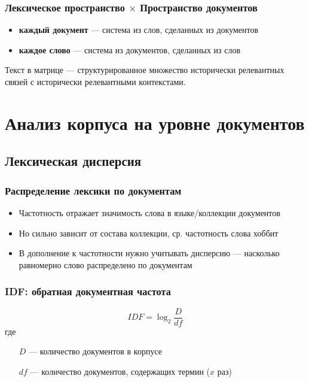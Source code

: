 \documentclass[svgnames]{beamer}
\begin{document}
\begin{frame}
  \frametitle{Лексическое пространство $\times$ Пространство документов}
  \begin{itemize}
  \item \textbf{каждый документ} — система из слов, сделанных из
    документов
  \item \textbf{каждое слово} — система из документов, сделанных из
    слов
  \end{itemize}
  \pause
  \begin{block}{Текст в матрице —}
    структурированное множество исторически релевантных связей с
    исторически релевантными контекстами.
  \end{block}
\end{frame}

\section{Анализ корпуса на уровне документов}

\subsection{Лексическая дисперсия}

\begin{frame}
  \frametitle{Распределение лексики по документам}
  \begin{itemize}
  \item Частотность отражает значимость слова в языке/коллекции документов
  \item Но сильно зависит от состава коллекции, ср. частотность слова
    \alert{хоббит}
  \item В дополнение к частотности нужно учитывать \alert{дисперсию} —
    насколько равномерно слово распределено по документам
  \end{itemize}
\end{frame}

\begin{frame}
  \frametitle{IDF: обратная документная частота}
  \begin{equation}
    IDF=\log_2\frac{D}{df}
  \end{equation}
  где 
  \begin{itemize}
  \item[$D$] — количество документов в корпусе
  \item[$df$] — количество документов, содержащих термин ($x$ раз)
  \end{itemize}
\end{frame}
\end{document}
